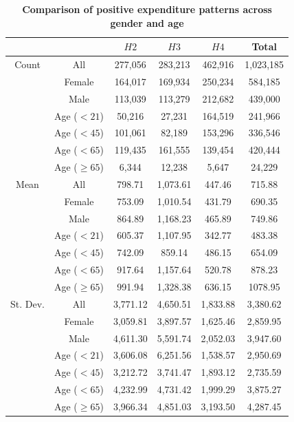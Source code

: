 \documentclass[letterpaper,12pt]{article}
\theoremstyle{definition}
\begin{document}
\begin{spacing}{1.5}{}
 \begin{table}[h!] \centering \captionsetup{width=4.0in}
    \caption{\label{TabExpPatterns}\textbf{Comparison of positive expenditure patterns across gender and age}}
      \begin{tabular}{ c c | c c c c }
        \hline\hline
         & & $H2$ & $H3$ & $H4$ & Total \\ 
        \hline
        Count & All & 277,056 & 283,213 & 462,916 & 1,023,185\\
        & Female  & 164,017 & 169,934 & 250,234 & 584,185 \\
        & Male & 113,039 & 113,279 & 212,682 & 439,000 \\
        & Age ($<21$) & 50,216  & 27,231 & 164,519 & 241,966 \\
        & Age ($<45$) & 101,061  & 82,189 &  153,296 & 336,546 \\ 
        & Age ($<65$) & 119,435 & 161,555 & 139,454 & 420,444 \\ 
        & Age ($\geq65$) & 6,344 & 12,238 & 5,647 & 24,229 \\ 
        \hline
        Mean & All & 798.71 & 1,073.61 & 447.46 & 715.88 \\ 
        & Female  & 753.09 & 1,010.54 & 431.79 & 690.35 \\ 
        & Male & 864.89 & 1,168.23 & 465.89 & 749.86 \\ 
        & Age ($<21$) & 605.37 & 1,107.95 & 342.77 & 483.38 \\ 
        & Age ($<45$) & 742.09 & 859.14 & 486.15 & 654.09 \\ 
        & Age ($<65$) & 917.64 & 1,157.64 & 520.78 & 878.23 \\ 
        & Age ($\geq65$) & 991.94 & 1,328.38 & 636.15 & 1078.95 \\ 
        \hline
        St. Dev. & All & 3,771.12 & 4,650.51 & 1,833.88 & 3,380.62\\
        & Female & 3,059.81 & 3,897.57 & 1,625.46 & 2,859.95\\ 
        & Male & 4,611.30 & 5,591.74 & 2,052.03 & 3,947.60 \\
        & Age ($<21$) & 3,606.08 & 6,251.56 & 1,538.57 & 2,950.69\\
        & Age ($<45$) & 3,212.72 & 3,741.47 & 1,893.12 & 2,735.59\\
        & Age ($<65$) & 4,232.99 & 4,731.42 & 1,999.29 & 3,875.27\\
        & Age ($\geq65$) & 3,966.34 & 4,851.03 & 3,193.50 & 4,287.45\\
        \hline\hline
    \end{tabular}
  \end{table}


\end{spacing}
\end{document}
